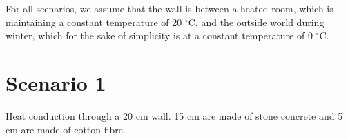 For all scenarios, we assume that the wall is between a heated room, which is maintaining a constant temperature of 20 $^{\circ}$C, and the outside world during winter, which for the sake of simplicity is at a constant temperature of 0 $^{\circ}$C.

\begin{table}[!h]\caption{\label{tab_heat}Material properties needed for scenarios.}
\end{table}


\section*{Scenario 1}

Heat conduction through a 20 cm wall. 15 cm are made of stone concrete and 5 cm are made of cotton fibre.

